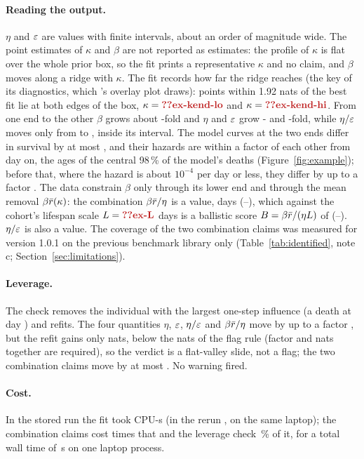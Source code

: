 \paragraph{Reading the output.} $\eta$ and $\varepsilon$ are values with finite intervals, about an order of magnitude wide.
The point estimates of $\kappa$ and $\beta$ are not reported as estimates: the profile of $\kappa$ is flat over the
whole prior box, so the fit prints a representative $\kappa$ and no claim, and $\beta$ moves along a ridge with $\kappa$.
The fit records how far the ridge reaches (the key  of its diagnostics, which 's
overlay plot draws): points within 1.92 nats of the best fit lie at both edges of the box, $\kappa=\C{ex-kend-lo}$ and
$\kappa=\C{ex-kend-hi}$. From one end to the other $\beta$ grows about -fold and $\eta$ and $\varepsilon$
grow - and -fold, while $\eta/\varepsilon$ moves only from  to
, inside its interval. The model curves at the two ends differ in survival by at most ,
and their hazards are within a factor  of each other from day  on, the ages of the
central 98\,\% of the model's deaths (Figure~\ref{fig:example}); before that, where the hazard is about $10^{-4}$ per day
or less, they differ by up to a factor .
The data constrain $\beta$ only through its lower end and through the mean removal $\beta\bar r(\kappa)$: the
combination $\beta\bar r/\eta$ is a value,  days (--), which against the
cohort's lifespan scale $L=\C{ex-L}$ days is a ballistic score $B=\beta\bar r/(\eta L)$ of 
(--). $\eta/\varepsilon$ is also a value. The coverage of the two combination claims was measured for version 1.0.1 on the
previous benchmark library only (Table~\ref{tab:identified}, note c; Section~\ref{sec:limitations}).

\paragraph{Leverage.} The check removes the individual with the largest one-step influence (a death at day
) and refits. The four quantities $\eta$, $\varepsilon$, $\eta/\varepsilon$ and $\beta\bar r/\eta$ move by up to a factor
, but the refit gains only  nats, below the  nats of the flag rule
(factor  and  nats together are required), so the verdict is a flat-valley slide, not a
flag; the two combination claims move by at most . No warning fired.

\paragraph{Cost.} In the stored run the fit took  CPU-s (in the rerun , on the same laptop); the combination claims cost  times that and the
leverage check \,\% of it, for a total wall time of \,s on one laptop process.
